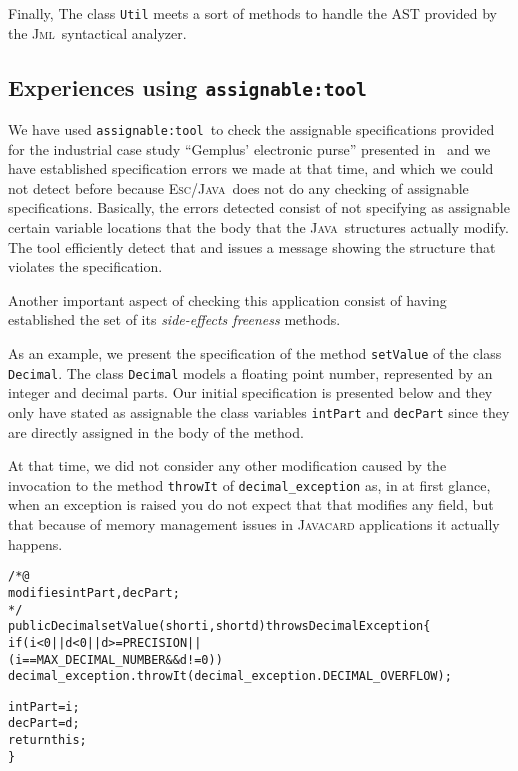 \documentclass[a4paper]{llncs}
\newcommand{\jml}{\textsc{Jml}}
\newcommand{\escj}{\textsc{Esc/Java}}
\newcommand{\java}{\textsc{Java}}
\newcommand{\modtool}{\texttt{assignable:tool}}
\begin{document}
Finally, The class \texttt{Util} 
meets a sort of methods to handle the \textsc{AST} provided by the
\jml~syntactical analyzer.






\subsection{Experiences using \modtool}
\label{sub-sec-usi-the-too}
We have used \modtool~to check the assignable specifications provided
for the industrial case study ``Gemplus' electronic purse'' presented
in~\cite{CatanoH02a} and we have established specification
errors we made at that time, and which we could not detect before
because
\escj~does not do any checking of assignable
specifications. Basically, the errors detected consist of not
specifying as
assignable certain variable locations that the body that the
\java~structures actually modify. The tool efficiently detect
that and issues a message showing the structure that
violates the specification. 

Another important aspect of checking this application consist of
having established the set of its \emph{side-effects freeness}
methods. 

As an example, we present the specification of the
method \texttt{setValue} of the class \texttt{Decimal}. The class
\texttt{Decimal} models a floating point number, represented by an
integer and decimal parts. Our initial specification is presented
below and they only have stated as assignable the class variables
\texttt{intPart} and \texttt{decPart} since they are directly assigned 
in the body of the method. 

At that time, we did not consider any other
modification caused by the invocation to the method \texttt{throwIt}
of \texttt{decimal\_exception} as, in at first glance, when an exception
is raised you do not expect that that modifies any field, but that
because of memory management issues in \textsc{Javacard} applications
it actually happens.
\begin{alltt}
/*@ 
  modifies intPart, decPart;
*/ 
public Decimal setValue(short i, short d) throws DecimalException\verb!{!
  if(i < 0 || d < 0 || d >= PRECISION || 
     (i == MAX_DECIMAL_NUMBER && d != 0))
    decimal_exception.throwIt(decimal_exception.DECIMAL_OVERFLOW);

  intPart = i;
  decPart = d;
  return this;
\verb!}!
\end{alltt}
\end{document}
